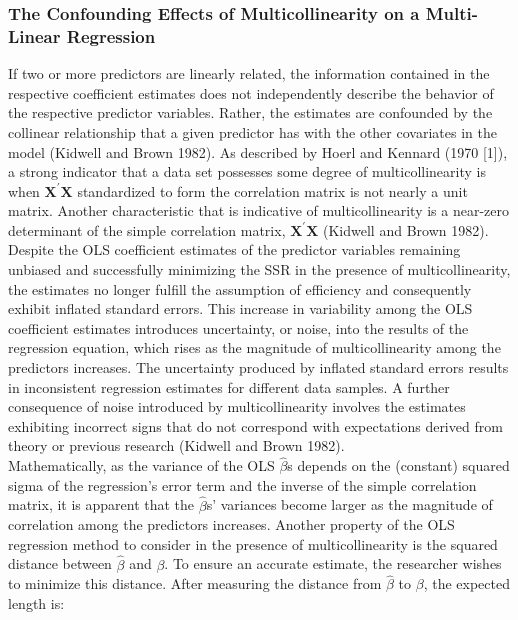 \subsubsection{The Confounding Effects of Multicollinearity on a Multi-Linear Regression}

\noindent If two or more predictors are linearly related, the information contained in the respective coefficient estimates does not independently describe the behavior of the respective predictor variables. Rather, the estimates are confounded by the collinear relationship that a given predictor has with the other covariates in the model (Kidwell and Brown 1982). As described by Hoerl and Kennard (1970 [1]), a strong indicator that a data set possesses some degree of multicollinearity is when $\mathbf X^{\prime} \mathbf X$ standardized to form the correlation matrix is not nearly a unit matrix. Another characteristic that is indicative of multicollinearity is a near-zero determinant of the simple correlation matrix, $\mathbf X^{\prime} \mathbf X$ (Kidwell and Brown 1982). \\

\noindent Despite the OLS coefficient estimates of the predictor variables remaining unbiased and successfully minimizing the SSR in the presence of multicollinearity, the estimates no longer fulfill the assumption of efficiency and consequently exhibit inflated standard errors. This increase in variability among the OLS coefficient estimates introduces uncertainty, or noise, into the results of the regression equation, which rises as the magnitude of multicollinearity among the predictors increases. The uncertainty produced by inflated standard errors results in inconsistent regression estimates for different data samples. A further consequence of noise introduced by multicollinearity involves the estimates exhibiting incorrect signs that do not correspond with expectations derived from theory or previous research (Kidwell and Brown 1982). \\

\noindent Mathematically, as the variance of the OLS $\hat{\beta}$s depends on the (constant) squared sigma of the regression's error term and the inverse of the simple correlation matrix, it is apparent that the $\hat{\beta}$s' variances become larger as the magnitude of correlation among the predictors increases. Another property of the OLS regression method to consider in the presence of multicollinearity is the squared distance between $\hat{\beta}$ and $\beta$. To ensure an accurate estimate, the researcher wishes to minimize this distance. After measuring the distance from $\hat{\beta}$ to $\beta$, the expected length is: 


